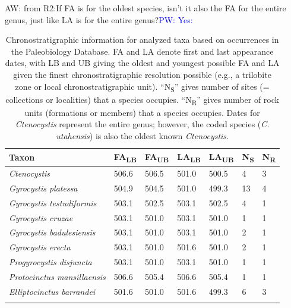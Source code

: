 \documentclass{article}
\newcommand{\amw}[1]{{\textcolor{OliveGreen}{AW: #1}}} %
\newcommand{\pjw}[1]{{\textcolor{blue}{PW: #1}}} %
\begin{document}
\begin{table}[]
\caption{Chronostratigraphic information for analyzed taxa based on occurrences in the Paleobiology Database.  FA and LA denote first and last appearance dates, with LB and UB giving the oldest and youngest possible FA and LA given the finest chronostratigraphic resolution possible (e.g., a trilobite zone or local chronostratigraphic unit). “N\textsubscript{S}” gives number of sites (= collections or localities) that a species occupies.  “N\textsubscript{R}” gives number of rock units (formations or members) that a species occupies. Dates for \textit{Ctenocystis} represent the entire genus; however, the coded species (\textit{C. utahensis}) is also the oldest known \textit{Ctenocystis}.} \amw{from R2:If FA is for the oldest species, isn't it also the FA for the entire genus, just like LA is for the entire genus?}\pjw{Yes: }
\begin{tabular}{l|llllll}
\rowcolor[HTML]{C0C0C0} 
Taxon                                                 & FA\textsubscript{LB}  & FA\textsubscript{UB}  & LA\textsubscript{LB}  & LA\textsubscript{UB}  & N\textsubscript{S} & N\textsubscript{R} \\ \hline
\textit{Ctenocystis}                 & 506.6 & 506.5 & 501.0 & 500.5 & 4  & 3  \\
\rowcolor[HTML]{C0C0C0} 
\textit{Gyrocystis platessa}         & 504.9 & 504.5 & 501.0 & 499.3 & 13 & 4  \\
\textit{Gyrocystis testudiformis}    & 503.1 & 502.5 & 503.1 & 502.5 & 4  & 1  \\
\rowcolor[HTML]{C0C0C0} 
\textit{Gyrocystis cruzae}           & 503.1 & 501.0 & 503.1 & 501.0 & 1  & 1  \\
\textit{Gyrocystis badulesiensis}    & 503.1 & 501.0 & 503.1 & 501.0 & 2  & 1  \\
\rowcolor[HTML]{C0C0C0} 

\textit{Gyrocystis erecta}           & 503.1 & 501.0 & 501.6 & 501.0 & 2  & 1  \\
\textit{Progyrocystis disjuncta}     & 503.1 & 501.0 & 503.1 & 501.0 & 1  & 1  \\
\rowcolor[HTML]{C0C0C0} 
\textit{Protocinctus mansillaensis}  & 506.6 & 505.4 & 506.6 & 505.4 & 1  & 1  \\
\textit{Elliptocinctus barrandei}    & 501.6 & 501.0 & 501.6 & 499.3 & 6  & 3  \\
\rowcolor[HTML]{C0C0C0} 


\end{tabular}
\end{table}
\end{document}
